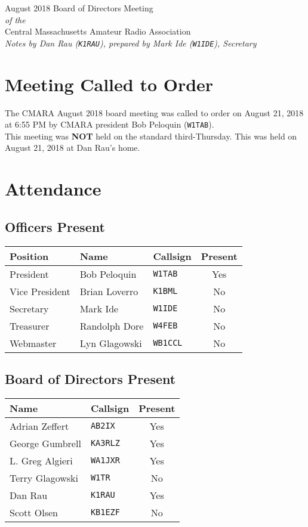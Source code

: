 \documentclass[10pt,letterpaper]{article}
\begin{document}
\begin{center}
{\huge August 2018 Board of Directors Meeting}\\
\emph{of the}\\
{\Large Central Massachusetts Amateur Radio Association}\\
\emph{Notes by Dan Rau (\texttt{K1RAU}), prepared by Mark Ide (\texttt{W1IDE}), Secretary}
\end{center}

\section{Meeting Called to Order}
The CMARA August 2018 board meeting was called to order on August 21, 2018 at 6:55 PM by CMARA president Bob Peloquin (\texttt{W1TAB}).\\

This meeting was \textbf{NOT} held on the standard third-Thursday. This was held on August 21, 2018 at Dan Rau's home.

\section{Attendance}

\subsection{Officers Present}
\begin{tabular}{|l|l|l|c|}
  \hline
  \textbf{Position} & \textbf{Name}  & \textbf{Callsign} & \textbf{Present} \\ \hline
  President         & Bob Peloquin   & \texttt{W1TAB}    & Yes \\
  Vice President    & Brian Loverro  & \texttt{K1BML}    & No  \\
  Secretary         & Mark Ide       & \texttt{W1IDE}    & No  \\
  Treasurer         & Randolph Dore  & \texttt{W4FEB}    & No  \\
  Webmaster         & Lyn Glagowski  & \texttt{WB1CCL}   & No  \\
  \hline
\end{tabular}

\subsection{Board of Directors Present}
\begin{tabular}{|l|l|c|}
  \hline
  \textbf{Name}   & \textbf{Callsign} & \textbf{Present} \\ \hline
  Adrian Zeffert  & \texttt{AB2IX}    &  Yes \\ \hline
  George Gumbrell & \texttt{KA3RLZ}   &  Yes \\ \hline
  L. Greg Algieri & \texttt{WA1JXR}   &  Yes \\ \hline
  Terry Glagowski & \texttt{W1TR}     &  No  \\ \hline
  Dan Rau         & \texttt{K1RAU}    &  Yes \\ \hline
  Scott Olsen     & \texttt{KB1EZF}   &  No  \\ \hline
\end{tabular}\\
\end{document}
